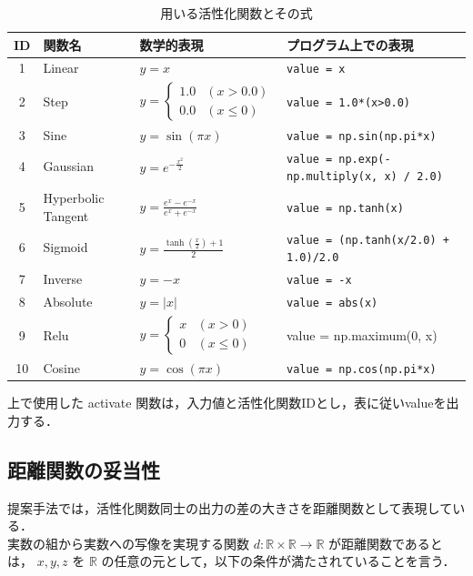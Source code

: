 \begin{table}[H]
    \caption{用いる活性化関数とその式}
    \centering
    \begin{tabular}{clll}
        \hline
        ID & 関数名 & 数学的表現 & プログラム上での表現 \\
        \hline \hline
        1 & Linear & $ y = x $ & \texttt{value = x} \\
        2 & Step & $ y = \begin{cases}
            1.0 & (x > 0.0) \\
            0.0 & (x \leq 0)
            \end{cases} $ & \texttt{value = 1.0*(x>0.0)} \\
        3 & Sine & $ y = \sin(\pi x) $ & \texttt{value = np.sin(np.pi*x)} \\
        4 & Gaussian & $ y = e^{-\frac{x^2}{2}} $ & \texttt{value = np.exp(-np.multiply(x, x) / 2.0)} \\
        5 & Hyperbolic Tangent & $ y = \frac{e^{x} - e^{-x}}{e^{x} + e^{-x}} $ & \texttt{value = np.tanh(x)} \\
        6 & Sigmoid & $ y = \frac{\tanh\left(\frac{x}{2}\right) + 1}{2} $ & \texttt{value = (np.tanh(x/2.0) + 1.0)/2.0} \\
        7 & Inverse & $ y = -x $ & \texttt{value = -x} \\
        8 &Absolute & $ y = |x| $ & \texttt{value = abs(x)} \\
        9 & Relu & $ y = 
        \begin{cases}
        x & (x > 0)\\
        0 & (x \leq 0)
        \end{cases} $ & value = np.maximum(0, x) \\
        10 & Cosine & $ y = \cos(\pi x) $ & \texttt{value = np.cos(np.pi*x)} \\
        \hline
    \end{tabular}
\end{table}

上で使用した activate 関数は，入力値と活性化関数IDとし，表に従いvalueを出力する．

\clearpage
\subsection{距離関数の妥当性}
提案手法では，活性化関数同士の出力の差の大きさを距離関数として表現している． \\
実数の組から実数への写像を実現する関数 $ d: \mathbb{R} \times \mathbb{R} \rightarrow \mathbb{R} $ が距離関数であるとは， $ x, y, z $ を $ \mathbb{R} $ の任意の元として，以下の条件が満たされていることを言う\cite{距離関数}．


